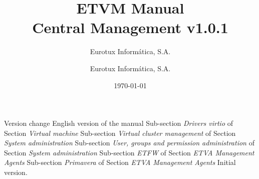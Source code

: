 \documentclass[12pt,a4paper,english]{scrreprt}
\author{Eurotux Informática, S.A.}
\title{ETVM Manual\\Central Management v1.0.1}
\subtitle{Eurotux Informática, S.A.}
\date{\today}
\begin{document}
\maketitle

\begin{Log}
Version change
English version of the manual
Sub-section \textit{Drivers virtio} of Section \textit{Virtual machine}
Sub-section \textit{Virtual cluster management} of Section \textit{System administration}
Sub-section \textit{User, groups and permission administration} of Section \textit{System administration}
Sub-section \textit{ETFW} of Section \textit{ETVA Management Agents}
Sub-section \textit{Primavera} of Section \textit{ETVA Management Agents}
Initial version.
\end{Log}

\tableofcontents

\listoffigures


%
%


%
\end{document}
